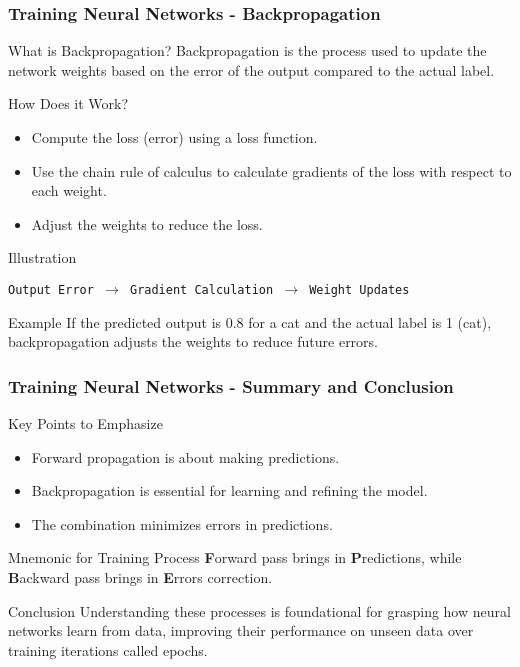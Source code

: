 \documentclass[aspectratio=169]{beamer}
\begin{document}
\begin{frame}[fragile]
    \frametitle{Training Neural Networks - Backpropagation}
    \begin{block}{What is Backpropagation?}
        Backpropagation is the process used to update the network weights based on the error of the output compared to the actual label.
    \end{block}

    \begin{block}{How Does it Work?}
        \begin{itemize}
            \item Compute the loss (error) using a loss function.
            \item Use the chain rule of calculus to calculate gradients of the loss with respect to each weight.
            \item Adjust the weights to reduce the loss.
        \end{itemize}
    \end{block}

    \begin{block}{Illustration}
    \begin{center}
    \texttt{Output Error $\rightarrow$ Gradient Calculation $\rightarrow$ Weight Updates}
    \end{center}
    \end{block}

    \begin{block}{Example}
        If the predicted output is 0.8 for a cat and the actual label is 1 (cat), backpropagation adjusts the weights to reduce future errors.
    \end{block}
\end{frame}

\begin{frame}[fragile]
    \frametitle{Training Neural Networks - Summary and Conclusion}
    \begin{block}{Key Points to Emphasize}
        \begin{itemize}
            \item Forward propagation is about making predictions.
            \item Backpropagation is essential for learning and refining the model.
            \item The combination minimizes errors in predictions.
        \end{itemize}
    \end{block}

    \begin{block}{Mnemonic for Training Process}
        \textbf{F}orward pass brings in \textbf{P}redictions, while \textbf{B}ackward pass brings in \textbf{E}rrors correction.
    \end{block}

    \begin{block}{Conclusion}
        Understanding these processes is foundational for grasping how neural networks learn from data,
        improving their performance on unseen data over training iterations called epochs.
    \end{block}
\end{frame}
\end{document}
